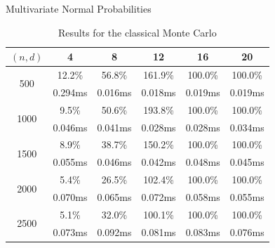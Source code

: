 \begin{frame}{Multivariate Normal Probabilities} 
	
	\begin{table}[!h]
		\centering
		{
			\begin{tabular}{@{}cccccc@{}}
				\toprule
				$(n, d)$ 				  & 4 		& 8 	  & 12 		& 16 	  & 20	 \\ \midrule
				\multirow{2}{*}{500}  & 12.2\%  & 56.8\%  & 161.9\% & 100.0\% & 100.0\% \\
									  & 0.294ms & 0.016ms & 0.018ms & 0.019ms & 0.019ms \\
				\multirow{2}{*}{1000} & 9.5\%   & 50.6\%  & 193.8\% & 100.0\% & 100.0\% \\
									  & 0.046ms & 0.041ms & 0.028ms & 0.028ms & 0.034ms \\
				\multirow{2}{*}{1500} & 8.9\%   & 38.7\%  & 150.2\% & 100.0\% & 100.0\% \\
									  & 0.055ms & 0.046ms & 0.042ms & 0.048ms & 0.045ms \\
				\multirow{2}{*}{2000} & 5.4\%   & 26.5\%  & 102.4\% & 100.0\% & 100.0\% \\
									  & 0.070ms & 0.065ms & 0.072ms & 0.058ms & 0.055ms \\
				\multirow{2}{*}{2500} & 5.1\%   & 32.0\%  & 100.1\% & 100.0\% & 100.0\% \\
									  & 0.073ms & 0.092ms & 0.081ms & 0.083ms & 0.076ms \\
				\bottomrule
			\end{tabular}%
		}
		\caption{Results for the classical Monte Carlo}
		\label{tab:results_mc}
	\end{table}	

\end{frame}

